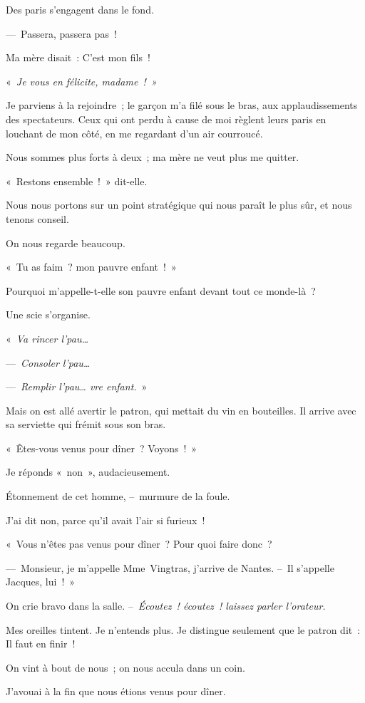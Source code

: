 \documentclass[french,twoside]{book} %
\begin{document}
Des paris s’engagent dans le fond.\par
— Passera, passera pas !\par
Ma mère disait : C’est mon fils !\par
« \emph{Je vous en félicite, madame ! »}\par
Je parviens à la rejoindre ; le garçon m’a filé sous le bras, aux applaudissements des spectateurs. Ceux qui ont perdu à cause de moi règlent leurs paris en louchant de mon côté, en me regardant d’un air courroucé.\par
Nous sommes plus forts à deux ; ma mère ne veut plus me quitter.\par
« Restons ensemble ! » dit-elle.\par
Nous nous portons sur un point stratégique qui nous paraît le plus sûr, et nous tenons conseil.\par
On nous regarde beaucoup.\par
« Tu as faim ? mon pauvre enfant ! »\par
Pourquoi m’appelle-t-elle son pauvre enfant devant tout ce monde-là ?\par
Une scie s’organise.\par
« \emph{Va rincer l’pau…}\par
— \emph{Consoler l’pau…}\par
— \emph{Remplir l’pau… vre enfant.} »\par
Mais on est allé avertir le patron, qui mettait du vin en bouteilles. Il arrive avec sa serviette qui frémit sous son bras.\par
« Êtes-vous venus pour dîner ? Voyons ! »\par
Je réponds « non », audacieusement.\par
Étonnement de cet homme, – murmure de la foule.\par
J’ai dit non, parce qu’il avait l’air si furieux !\par
« Vous n’êtes pas venus pour dîner ? Pour quoi faire donc ?\par
— Monsieur, je m’appelle Mme Vingtras, j’arrive de Nantes. – Il s’appelle Jacques, lui ! »\par
On crie bravo dans la salle. – \emph{Écoutez ! écoutez ! laissez parler l’orateur.}\par
Mes oreilles tintent. Je n’entends plus. Je distingue seulement que le patron dit : Il faut en finir !\par
On vint à bout de nous ; on nous accula dans un coin.\par
J’avouai à la fin que nous étions venus pour dîner.\par
\end{document}
